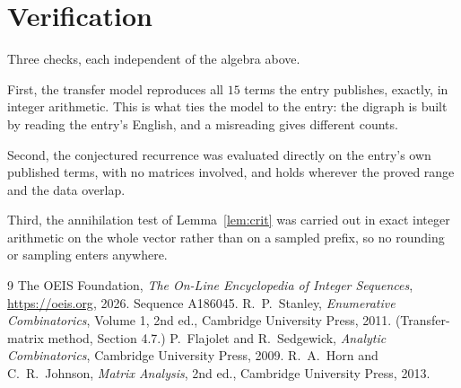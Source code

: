 \documentclass[11pt,a4paper]{article}
\theoremstyle{plain}
\theoremstyle{definition}
\begin{document}
\section{Verification}

Three checks, each independent of the algebra above.

First, the transfer model reproduces all $15$ terms the entry publishes, exactly, in
integer arithmetic. This is what ties the model to the entry: the digraph is built by reading
the entry's English, and a misreading gives different counts.

Second, the conjectured recurrence was evaluated directly on the entry's own published terms,
with no matrices involved, and holds wherever the proved range and the data overlap.

Third, the annihilation test of Lemma~\ref{lem:crit} was carried out in exact integer
arithmetic on the whole vector rather than on a sampled prefix, so no rounding or sampling
enters anywhere.

\begin{thebibliography}{9}
 The OEIS Foundation, \emph{The On-Line Encyclopedia of Integer
Sequences}, \url{https://oeis.org}, 2026. Sequence A186045.
 R.~P.~Stanley, \emph{Enumerative Combinatorics}, Volume 1, 2nd ed.,
Cambridge University Press, 2011. (Transfer-matrix method, Section 4.7.)
 P.~Flajolet and R.~Sedgewick, \emph{Analytic Combinatorics}, Cambridge
University Press, 2009.
 R.~A.~Horn and C.~R.~Johnson, \emph{Matrix Analysis}, 2nd ed., Cambridge
University Press, 2013.
\end{thebibliography}
\end{document}
